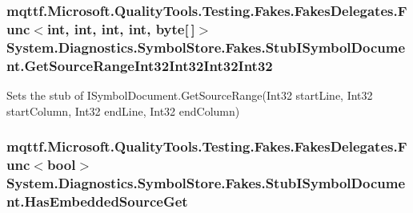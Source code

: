 \hypertarget{class_system_1_1_diagnostics_1_1_symbol_store_1_1_fakes_1_1_stub_i_symbol_document_a7ecafccf42193dec6f30638c96766f08}{
\subsubsection[{Get\-Source\-Range\-Int32\-Int32\-Int32\-Int32}]{\setlength{\rightskip}{0pt plus 5cm}mqttf.\-Microsoft.\-Quality\-Tools.\-Testing.\-Fakes.\-Fakes\-Delegates.\-Func$<$int, int, int, int, byte\mbox{[}$\,$\mbox{]}$>$ System.\-Diagnostics.\-Symbol\-Store.\-Fakes.\-Stub\-I\-Symbol\-Document.\-Get\-Source\-Range\-Int32\-Int32\-Int32\-Int32}}\label{class_system_1_1_diagnostics_1_1_symbol_store_1_1_fakes_1_1_stub_i_symbol_document_a7ecafccf42193dec6f30638c96766f08}


Sets the stub of I\-Symbol\-Document.\-Get\-Source\-Range(\-Int32 start\-Line, Int32 start\-Column, Int32 end\-Line, Int32 end\-Column)

\hypertarget{class_system_1_1_diagnostics_1_1_symbol_store_1_1_fakes_1_1_stub_i_symbol_document_a6fe81dd88b126c8825d5e747984d6373}{
\subsubsection[{Has\-Embedded\-Source\-Get}]{\setlength{\rightskip}{0pt plus 5cm}mqttf.\-Microsoft.\-Quality\-Tools.\-Testing.\-Fakes.\-Fakes\-Delegates.\-Func$<$bool$>$ System.\-Diagnostics.\-Symbol\-Store.\-Fakes.\-Stub\-I\-Symbol\-Document.\-Has\-Embedded\-Source\-Get}}\label{class_system_1_1_diagnostics_1_1_symbol_store_1_1_fakes_1_1_stub_i_symbol_document_a6fe81dd88b126c8825d5e747984d6373}


